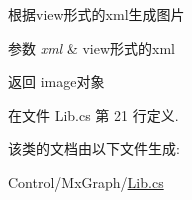 根据view形式的xml生成图片 


\begin{DoxyParams}{参数}
{\em xml} & view形式的xml\\
\hline
\end{DoxyParams}
\begin{DoxyReturn}{返回}
image对象
\end{DoxyReturn}


在文件 Lib.\-cs 第 21 行定义.



该类的文档由以下文件生成\-:\begin{DoxyCompactItemize}
\item 
Control/\-Mx\-Graph/\hyperlink{_control_2_mx_graph_2_lib_8cs}{Lib.\-cs}\end{DoxyCompactItemize}
